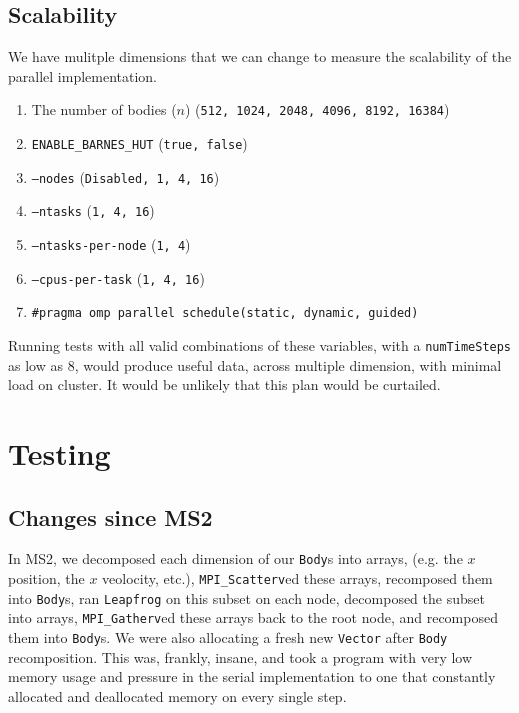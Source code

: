 \documentclass[11pt,a4paper]{article}
\begin{document}
\subsection*{Scalability}

We have mulitple dimensions that we can change to measure the scalability of the parallel implementation.

\begin{enumerate}
    \item The number of bodies ($n$) (\texttt{512, 1024, 2048, 4096, 8192, 16384})
    \item \texttt{ENABLE\_BARNES\_HUT} (\texttt{true, false})
    \item \texttt{--nodes} (\texttt{Disabled, 1, 4, 16})
    \item \texttt{--ntasks} (\texttt{1, 4, 16})
    \item \texttt{--ntasks-per-node} (\texttt{1, 4})
    \item \texttt{--cpus-per-task} (\texttt{1, 4, 16})
    \item \texttt{\#pragma omp parallel schedule(static, dynamic, guided)}
\end{enumerate}

Running tests with all valid combinations of these variables, with a \texttt{numTimeSteps} as low as 8, would produce useful data, across multiple dimension, with minimal load on cluster. It would be unlikely that this plan would be curtailed.

\section*{Testing}

\subsection*{Changes since MS2}

In MS2, we decomposed each dimension of our \texttt{Body}s into arrays, (e.g. the $x$ position, the $x$ veolocity, etc.), \texttt{MPI\_Scatterv}ed these arrays, recomposed them into \texttt{Body}s, ran \texttt{Leapfrog} on this subset on each node, decomposed the subset into arrays, \texttt{MPI\_Gatherv}ed these arrays back to the root node, and recomposed them into \texttt{Body}s. We were also allocating a fresh new \texttt{Vector} after \texttt{Body} recomposition. This was, frankly, insane, and took a program with very low memory usage and pressure in the serial implementation to one that constantly allocated and deallocated memory on every single step.
\end{document}
